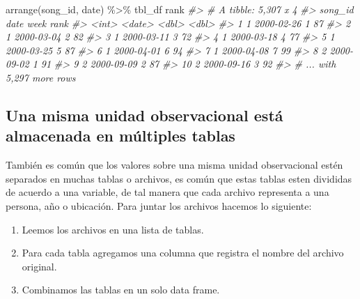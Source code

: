 \documentclass[
]{book}
\newenvironment{Shaded}{\begin{snugshade}}{\end{snugshade}}
\newcommand{\CommentTok}[1]{\textcolor[rgb]{0.56,0.35,0.01}{\textit{#1}}}
\newcommand{\FunctionTok}[1]{\textcolor[rgb]{0.00,0.00,0.00}{#1}}
\newcommand{\NormalTok}[1]{#1}
\newcommand{\SpecialCharTok}[1]{\textcolor[rgb]{0.00,0.00,0.00}{#1}}
\providecommand{\tightlist}{%
  \setlength{\itemsep}{0pt}\setlength{\parskip}{0pt}}
\begin{document}
\begin{Shaded}
\begin{Highlighting}[]
  \FunctionTok{arrange}\NormalTok{(song\_id, date) }\SpecialCharTok{\%\textgreater{}\%}
\NormalTok{  tbl\_df}
\NormalTok{rank}
\CommentTok{\#\textgreater{} \# A tibble: 5,307 x 4}
\CommentTok{\#\textgreater{}    song\_id date        week  rank}
\CommentTok{\#\textgreater{}      \textless{}int\textgreater{} \textless{}date\textgreater{}     \textless{}dbl\textgreater{} \textless{}dbl\textgreater{}}
\CommentTok{\#\textgreater{}  1       1 2000{-}02{-}26     1    87}
\CommentTok{\#\textgreater{}  2       1 2000{-}03{-}04     2    82}
\CommentTok{\#\textgreater{}  3       1 2000{-}03{-}11     3    72}
\CommentTok{\#\textgreater{}  4       1 2000{-}03{-}18     4    77}
\CommentTok{\#\textgreater{}  5       1 2000{-}03{-}25     5    87}
\CommentTok{\#\textgreater{}  6       1 2000{-}04{-}01     6    94}
\CommentTok{\#\textgreater{}  7       1 2000{-}04{-}08     7    99}
\CommentTok{\#\textgreater{}  8       2 2000{-}09{-}02     1    91}
\CommentTok{\#\textgreater{}  9       2 2000{-}09{-}09     2    87}
\CommentTok{\#\textgreater{} 10       2 2000{-}09{-}16     3    92}
\CommentTok{\#\textgreater{} \# ... with 5,297 more rows}
\end{Highlighting}
\end{Shaded}

\hypertarget{una-misma-unidad-observacional-estuxe1-almacenada-en-muxfaltiples-tablas}{%
\subsection*{Una misma unidad observacional está almacenada en múltiples tablas}\label{una-misma-unidad-observacional-estuxe1-almacenada-en-muxfaltiples-tablas}}

También es común que los valores sobre una misma unidad observacional estén
separados en muchas tablas o archivos, es común que estas tablas esten divididas
de acuerdo a una variable, de tal manera que cada archivo representa a una
persona, año o ubicación. Para juntar los archivos hacemos lo siguiente:

\begin{enumerate}
\def\labelenumi{\arabic{enumi}.}
\tightlist
\item
  Leemos los archivos en una lista de tablas.
\item
  Para cada tabla agregamos una columna que registra el nombre del archivo
  original.
\item
  Combinamos las tablas en un solo data frame.
\end{enumerate}
\end{document}
